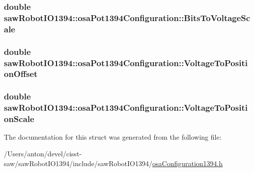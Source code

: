 \subsubsection[{Bits\+To\+Voltage\+Scale}]{\setlength{\rightskip}{0pt plus 5cm}double saw\+Robot\+I\+O1394\+::osa\+Pot1394\+Configuration\+::\+Bits\+To\+Voltage\+Scale}\label{structsaw_robot_i_o1394_1_1osa_pot1394_configuration_ac5a3c1c05766de6b45c1b5b601c11700}
\hypertarget{structsaw_robot_i_o1394_1_1osa_pot1394_configuration_a770016798ff462addf14c30b3745f200}{}
\subsubsection[{Voltage\+To\+Position\+Offset}]{\setlength{\rightskip}{0pt plus 5cm}double saw\+Robot\+I\+O1394\+::osa\+Pot1394\+Configuration\+::\+Voltage\+To\+Position\+Offset}\label{structsaw_robot_i_o1394_1_1osa_pot1394_configuration_a770016798ff462addf14c30b3745f200}
\hypertarget{structsaw_robot_i_o1394_1_1osa_pot1394_configuration_adc6b92026b60d4e3dd108a6acc805e4c}{}
\subsubsection[{Voltage\+To\+Position\+Scale}]{\setlength{\rightskip}{0pt plus 5cm}double saw\+Robot\+I\+O1394\+::osa\+Pot1394\+Configuration\+::\+Voltage\+To\+Position\+Scale}\label{structsaw_robot_i_o1394_1_1osa_pot1394_configuration_adc6b92026b60d4e3dd108a6acc805e4c}


The documentation for this struct was generated from the following file\+:\begin{DoxyCompactItemize}
\item 
/\+Users/anton/devel/cisst-\/saw/saw\+Robot\+I\+O1394/include/saw\+Robot\+I\+O1394/\hyperlink{osa_configuration1394_8h}{osa\+Configuration1394.\+h}\end{DoxyCompactItemize}
